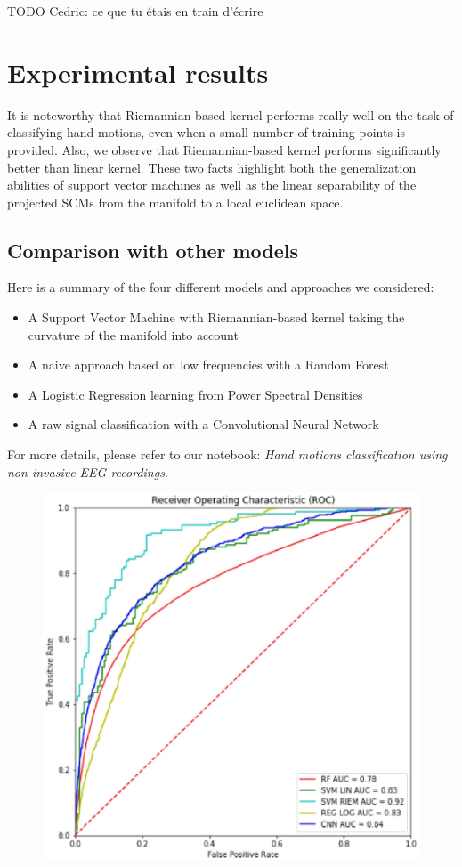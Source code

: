 \documentclass[a4paper,11pt]{report}
\begin{document}
TODO Cedric: ce que tu étais en train d'écrire

\chapter{Experimental results}

It is noteworthy that Riemannian-based kernel performs really well on the task of classifying hand
motions, even when a small number of training points is provided. 
Also, we observe that Riemannian-based kernel performs significantly better than linear kernel.
These two facts highlight both the generalization abilities of support vector machines as well as the linear separability
of the projected SCMs from the manifold to a local euclidean space.

\section{Comparison with other models}

Here is a summary of the four different models and approaches we considered:
\begin{itemize}
  \item A Support Vector Machine with Riemannian-based kernel taking the curvature of the manifold into account
  \item A naive approach based on low frequencies with a Random Forest
  \item A Logistic Regression learning from Power Spectral Densities
  \item A raw signal classification with a Convolutional Neural Network
\end{itemize}
For more details, please refer to our notebook:
\textit{Hand motions classification using non-invasive EEG recordings}.


\begin{figure}[!h]
\begin{center}
  \includegraphics[width=.7\textwidth]{imgs/auc.eps}
  \end{center}
\end{figure}


\newpage



\end{document}
